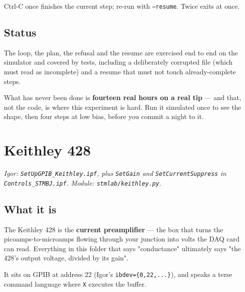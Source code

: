 Ctrl-C once finishes the current step; re-run with \texttt{--resume}. Twice exits at once.

\section{Status}

The loop, the plan, the refusal and the resume are exercised end to end on the simulator and covered by tests, including a deliberately corrupted file (which must read as incomplete) and a resume that must not touch already-complete steps.

What has never been done is \textbf{fourteen real hours on a real tip} --- and that, not the code, is where this experiment is hard. Run it simulated once to see the shape, then four steps at low bias, before you commit a night to it.

\setcounter{chapter}{19}
\chapter{Keithley 428}

\emph{Igor: \texttt{Set\discretionary{}{}{}Up\discretionary{}{}{}GPIB\_\discretionary{}{}{}Keithley.\discretionary{}{}{}ipf}, plus \texttt{Set\discretionary{}{}{}Gain} and \texttt{Set\discretionary{}{}{}Current\discretionary{}{}{}Suppress} in \texttt{Controls\_\discretionary{}{}{}STMBJ.\discretionary{}{}{}ipf}. Module: \texttt{stmlab/\discretionary{}{}{}keithley.\discretionary{}{}{}py}.}

\section{What it is}

The Keithley 428 is the \textbf{current preamplifier} --- the box that turns the picoamps-to-microamps flowing through your junction into volts the DAQ card can read. Everything in this folder that says "conductance" ultimately says "the 428's output voltage, divided by its gain".

It sits on GPIB at address 22 (Igor's \texttt{ibdev=\{0,\discretionary{}{}{}22,\discretionary{}{}{}.\discretionary{}{}{}.\discretionary{}{}{}.\discretionary{}{}{}\}}), and speaks a terse command language where \texttt{X} executes the buffer.

